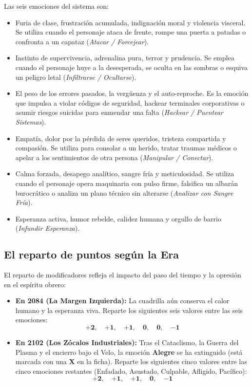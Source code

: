 Las seis emociones del sistema son:
\begin{itemize}
    \item {} Furia de clase, frustración acumulada, indignación moral y violencia visceral. Se utiliza cuando el personaje ataca de frente, rompe una puerta a patadas o confronta a un capataz (\textit{Atacar / Forcejear}).
    \item {} Instinto de supervivencia, adrenalina pura, terror y prudencia. Se emplea cuando el personaje huye a la desesperada, se oculta en las sombras o esquiva un peligro letal (\textit{Infiltrarse / Ocultarse}).
    \item {} El peso de los errores pasados, la vergüenza y el auto-reproche. Es la emoción que impulsa a violar códigos de seguridad, hackear terminales corporativas o asumir riesgos suicidas para enmendar una falta (\textit{Hackear / Puentear Sistemas}).
    \item {} Empatía, dolor por la pérdida de seres queridos, tristeza compartida y compasión. Se utiliza para consolar a un herido, tratar traumas médicos o apelar a los sentimientos de otra persona (\textit{Manipular / Conectar}).
    \item {} Calma forzada, desapego analítico, sangre fría y meticulosidad. Se utiliza cuando el personaje opera maquinaria con pulso firme, falsifica un albarán burocrático o analiza un plano técnico sin alterarse (\textit{Analizar con Sangre Fría}).
    \item {} Esperanza activa, humor rebelde, calidez humana y orgullo de barrio (\textit{Infundir Esperanza}).
\end{itemize}

\subsection{El reparto de puntos según la Era}
El reparto de modificadores refleja el impacto del paso del tiempo y la opresión en el espíritu obrero:
\begin{itemize}
    \item \textbf{En 2084 (La Margen Izquierda):} La cuadrilla aún conserva el calor humano y la esperanza viva. Reparte los siguientes seis valores entre las seis emociones:
    \[
    \mathbf{+2}, \quad \mathbf{+1}, \quad \mathbf{+1}, \quad \mathbf{0}, \quad \mathbf{0}, \quad \mathbf{-1}
    \]
    \item \textbf{En 2102 (Los Zócalos Industriales):} Tras el Cataclismo, la Guerra del Plasma y el encierro bajo el Velo, la emoción \textbf{Alegre} se ha extinguido (está marcada con una \textbf{X} en la ficha). Reparte los siguientes cinco valores entre las cinco emociones restantes (Enfadado, Asustado, Culpable, Afligido, Pacífico):
    \[
    \mathbf{+2}, \quad \mathbf{+1}, \quad \mathbf{+1}, \quad \mathbf{0}, \quad \mathbf{-1}
    \]
\end{itemize}

